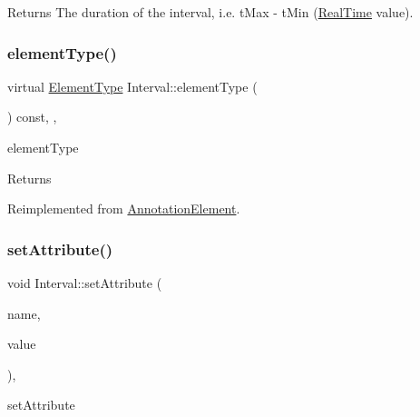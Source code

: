 \begin{DoxyReturn}{Returns}
The duration of the interval, i.\+e. t\+Max -\/ t\+Min (\hyperlink{struct_real_time}{Real\+Time} value). 
\end{DoxyReturn}
\mbox{\label{class_interval_a3ea5342504df09262d59cd2ab1658804}} 
\subsubsection{\texorpdfstring{element\+Type()}{elementType()}}
{\footnotesize\ttfamily virtual \hyperlink{class_annotation_element_af5282990ffbe25eeea8ab02037e344b0}{Element\+Type} Interval\+::element\+Type (\begin{DoxyParamCaption}{ }\end{DoxyParamCaption}) const\hspace{0.3cm}{\ttfamily [inline]}, {\ttfamily [override]}, {\ttfamily [virtual]}}



element\+Type 

\begin{DoxyReturn}{Returns}

\end{DoxyReturn}


Reimplemented from \hyperlink{class_annotation_element_a9b2d5cf05a2f81d9b2103a5c736dfb2d}{Annotation\+Element}.

\mbox{\label{class_interval_a0895204effc21e1f4ead9b78b4b9726f}} 
\subsubsection{\texorpdfstring{set\+Attribute()}{setAttribute()}}
{\footnotesize\ttfamily void Interval\+::set\+Attribute (\begin{DoxyParamCaption}\item[{const Q\+String \&}]{name,  }\item[{Q\+Variant}]{value }\end{DoxyParamCaption})\hspace{0.3cm}{\ttfamily [override]}, {\ttfamily [virtual]}}



set\+Attribute 


